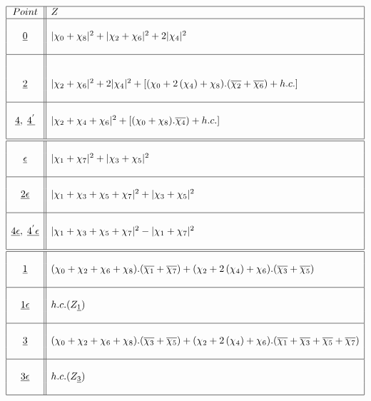 \documentclass[a4paper,11pt]{article}
\newcommand{\ch}[1]{\chi_{#1}}
\newcommand{\och}[1]{\overline{\chi_{#1}}}
\newcommand{\ud}[1]{\underline{#1}}
\newcommand{\ep}{\epsilon}
\newcommand{\xa}[1]{|\chi_{#1}|^2}
\newcommand{\xaa}[2]{|\chi_{#1} + \chi_{#2}|^2}
\newcommand{\xaaa}[3]{|\chi_{#1} + \chi_{#2} + \chi_{#3}|^2}
\newcommand{\xaaaa}[4]{|\chi_{#1} + \chi_{#2}+ \chi_{#3}+ \chi_{#4}|^2}
\begin{document}
\begin{table}
\scriptsize
$$
\begin{array}{|c||l|}
\hline
Point & Z \\
\hline
{}   & {} \\
\ud0 & \xaa{0}{8} + \xaa{2}{6} + 2\xa{4} \\
{}   & {} \\
\hline
{}   & {} \\
{}   & {} \\
\ud2 & \xaa{2}{6} + 2\xa{4} + [(\ch{0} + 2\, (\ch{4}) +
\ch{8}).(\och{2} + \och{6}) +  h.c.] \\
{}   & {} \\
\hline
{}   & {} \\
\ud4, \; \ud{4^{'}} & \xaaa{2}{4}{6} +[(\ch{0} + \ch{8}).\och{4})+ h.c.] \\
{}   & {} \\
\hline
\hline
{}   & {} \\
\ud{\ep} & \xaa{1}{7} + \xaa{3}{5} \\
{}   & {} \\
\hline
{}   & {} \\
\ud{2\ep} & \xaaaa{1}{3}{5}{7} + \xaa{3}{5} \\
{}   & {} \\
\hline
{}   & {} \\
\ud{4\ep}, \; \ud{4^{'}\ep} & \xaaaa{1}{3}{5}{7} - \xaa{1}{7} \\
{}   & {} \\
\hline
\hline
{}   & {} \\
\ud1 & (\ch{0} + \ch{2} + \ch{6} + \ch{8}).(\och{1} + \och{7}) +
(\ch{2} + 2\, (\ch{4})+ \ch{6}).(\och{3} + \och{5})  \\
{}   & {} \\
\hline
{}   & {} \\
\ud{1\ep} & h.c. (Z_{\ud1}) \\
{}   & {} \\
\hline
{}   & {} \\
\ud3 & (\ch{0} + \ch{2} + \ch{6} + \ch{8}).(\och{3} + \och{5}) +
(\ch{2} + 2\, (\ch{4}) + \ch{6}).(\och{1} + \och{3} + \och{5} +
\och{7}) \\
{}   & {} \\
\hline
{}   & {} \\
\ud{3\ep} & h.c. (Z_{\ud3}) \\
{}   & {} \\
\hline
\end{array}
$$
\normalsize
\caption{Twisted partition functions for the $D_6$ model}
\end{table}
\end{document}
